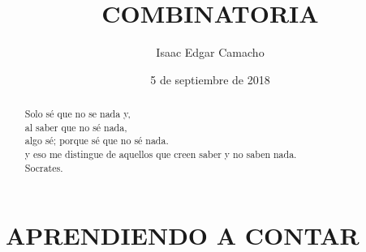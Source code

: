 \documentclass[a4paper,12pt]{article}
\title{COMBINATORIA}
\author{Isaac Edgar Camacho}
\date{5 de septiembre de 2018}
\begin{document}
\maketitle

\begin{abstract}
Solo sé que no se nada y, \\al saber que no sé nada, \\algo sé; porque sé que no sé nada.
\\y eso me distingue de aquellos que creen saber y no saben nada.
\\Socrates.

\end{abstract}


\section{APRENDIENDO A CONTAR}
\end{document}
